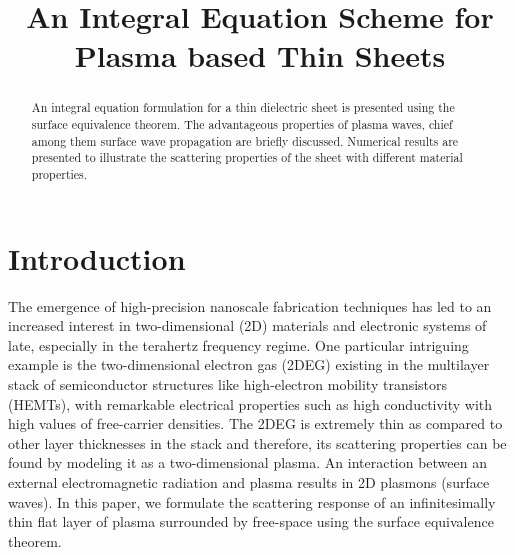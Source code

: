 \documentclass[conference, 10pt]{IEEEtran}
\renewcommand{\^}{\hat}  %
\begin{document}
\title{An Integral Equation Scheme for Plasma based Thin Sheets}


\author{
\and
{}
}
\maketitle


%
\begin{abstract}
  An integral equation formulation for a thin dielectric sheet is presented using the surface equivalence theorem. The advantageous properties of plasma waves, chief among them surface wave propagation are briefly discussed. Numerical results are presented to illustrate the scattering properties of the sheet with different material properties.
\end{abstract}

\IEEEpeerreviewmaketitle
\section{Introduction}

The emergence of high-precision nanoscale fabrication techniques has led to an increased interest in two-dimensional (2D) materials and electronic systems of late, especially in the terahertz frequency regime. One particular intriguing example is the two-dimensional electron gas (2DEG) existing in the multilayer stack of semiconductor structures like high-electron mobility transistors (HEMTs), with remarkable electrical properties such as high conductivity with high values of free-carrier densities. The 2DEG is extremely thin as compared to other layer thicknesses in the stack and therefore, its scattering properties can be found by modeling it as a two-dimensional plasma. An interaction between an external electromagnetic radiation and plasma results in 2D plasmons (surface waves). In this paper, we formulate the scattering response of an infinitesimally thin flat layer of plasma surrounded by free-space using the surface equivalence theorem.
\end{document}
